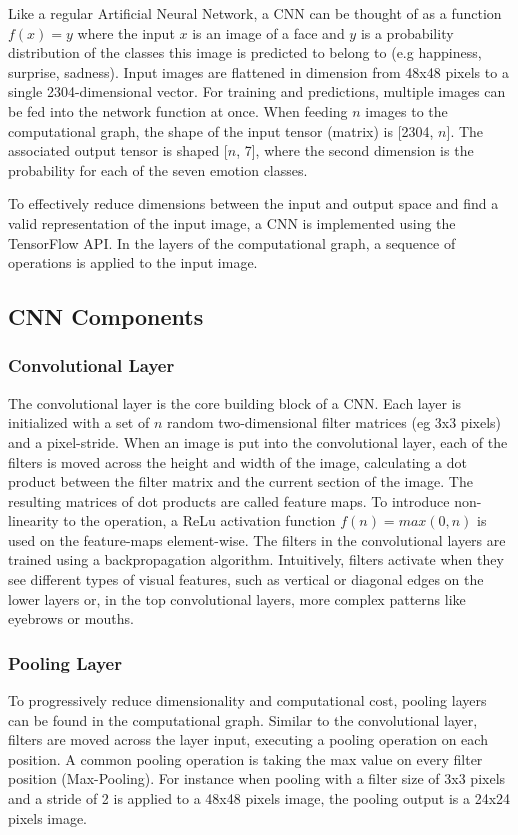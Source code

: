 \documentclass[twoside]{article}
\begin{document}
\begin{multicols}{2}
Like a regular Artificial Neural Network, a CNN can be thought of as a function $f(x) = y$ where the input $x$ is an image of a face and $y$ is a probability distribution of the classes this image is predicted to belong to (e.g happiness, surprise, sadness). Input images are flattened in dimension from 48x48 pixels to a single 2304-dimensional vector. For training and predictions, multiple images can be fed into the network function at once. When feeding $n$ images to the computational graph, the shape of the input tensor (matrix) is [2304, $n$]. The associated output tensor is shaped [$n$, 7], where the second dimension is the probability for each of the seven emotion classes.

To effectively reduce dimensions between the input and output space and find a valid representation of the input image, a CNN is implemented using the TensorFlow API. In the layers of the computational graph, a sequence of operations is applied to the input image. 

\subsection{CNN Components}

\subsubsection{Convolutional Layer}
The convolutional layer is the core building block of a CNN. Each layer is initialized with a set of $n$ random two-dimensional filter matrices (eg 3x3 pixels) and a pixel-stride. When an image is put into the convolutional layer, each of the filters is moved across the height and width of the image, calculating a dot product between the filter matrix and the current section of the image. The resulting matrices of dot products are called feature maps. To introduce non-linearity to the operation, a ReLu activation function $f(n) = max(0, n)$ is used on the feature-maps element-wise. The filters in the convolutional layers are trained using a backpropagation algorithm. Intuitively, filters activate when they see different types of visual features, such as vertical or diagonal edges on the lower layers or, in the top convolutional layers, more complex patterns like eyebrows or mouths.

\subsubsection{Pooling Layer}
To progressively reduce dimensionality and computational cost, pooling layers can be found in the computational graph. Similar to the convolutional layer, filters are moved across the layer input, executing a pooling operation on each position. A common pooling operation is taking the max value on every filter position (Max-Pooling). For instance when pooling with a filter size of 3x3 pixels and a stride of 2 is applied to a 48x48 pixels image, the pooling output is a 24x24 pixels image.


\end{multicols}
\end{document}
